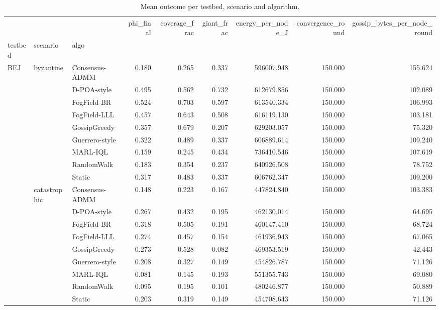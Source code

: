 \begin{table}
\caption{Mean outcome per testbed, scenario and algorithm.}
\label{tab:table1_main_grid}
\begin{tabular}{lllrrrrrr}
\toprule
 &  &  & phi\_final & coverage\_frac & giant\_frac & energy\_per\_node\_J & convergence\_round & gossip\_bytes\_per\_node\_round \\
testbed & scenario & algo &  &  &  &  &  &  \\
\midrule
\multirow[t]{99}{*}{BEJ} & \multirow[t]{9}{*}{byzantine} & Consensus-ADMM & 0.180 & 0.265 & 0.337 & 596007.948 & 150.000 & 155.624 \\
 &  & D-POA-style & 0.495 & 0.562 & 0.732 & 612679.856 & 150.000 & 102.089 \\
 &  & FogField-BR & 0.524 & 0.703 & 0.597 & 613540.334 & 150.000 & 106.993 \\
 &  & FogField-LLL & 0.457 & 0.643 & 0.508 & 616119.130 & 150.000 & 103.181 \\
 &  & GossipGreedy & 0.357 & 0.679 & 0.207 & 629203.057 & 150.000 & 75.320 \\
 &  & Guerrero-style & 0.322 & 0.489 & 0.337 & 606889.614 & 150.000 & 109.240 \\
 &  & MARL-IQL & 0.159 & 0.245 & 0.434 & 736410.546 & 150.000 & 107.619 \\
 &  & RandomWalk & 0.183 & 0.354 & 0.237 & 640926.508 & 150.000 & 78.752 \\
 &  & Static & 0.317 & 0.483 & 0.337 & 606762.347 & 150.000 & 109.200 \\
\cline{2-9}
 & \multirow[t]{9}{*}{catastrophic} & Consensus-ADMM & 0.148 & 0.223 & 0.167 & 447824.840 & 150.000 & 103.383 \\
 &  & D-POA-style & 0.267 & 0.432 & 0.195 & 462130.014 & 150.000 & 64.695 \\
 &  & FogField-BR & 0.318 & 0.505 & 0.191 & 460147.410 & 150.000 & 68.724 \\
 &  & FogField-LLL & 0.274 & 0.457 & 0.154 & 461936.943 & 150.000 & 67.065 \\
 &  & GossipGreedy & 0.273 & 0.528 & 0.082 & 469353.519 & 150.000 & 42.443 \\
 &  & Guerrero-style & 0.208 & 0.327 & 0.149 & 454826.787 & 150.000 & 71.126 \\
 &  & MARL-IQL & 0.081 & 0.145 & 0.193 & 551355.743 & 150.000 & 69.080 \\
 &  & RandomWalk & 0.095 & 0.195 & 0.101 & 480246.877 & 150.000 & 50.889 \\
 &  & Static & 0.203 & 0.319 & 0.149 & 454708.643 & 150.000 & 71.126 \\

\end{tabular}
\end{table}
